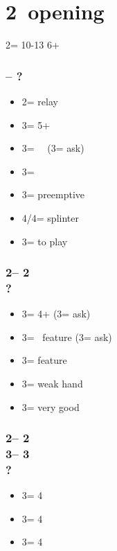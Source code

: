 \documentclass[12pt, a4paper]{article}
\begin{document}
\section*{\colorbox{blue!30}{2\spades\ opening}}
 {

    2\spades = 10-13 6+\spades

    \subsubsection*{\alrts{2\spades} -- ?}
    \begin{itemize}
        \item 2\nt = relay
        \item 3\clubs = 5+\hearts\ \fonce
        \item 3\diams = \minor\ \gf\ (3\hearts = ask)
        \item 3\hearts = \spades\ \invp
        \item 3\spades = preemptive
        \item 4\minor/4\hearts = splinter
        \item 3\nt = to play
    \end{itemize}

    \subsubsection*{2\spades -- 2\nt\\
                    ?}
    \begin{itemize}
        \item 3\clubs = 4+\twosuit{\minor}{\hearts} (3\diams = ask)
        \item 3\diams = \minor\ feature (3\hearts = ask)
        \item 3\hearts = \hearts feature
        \item 3\spades = weak hand
        \item 3\nt = very good \spades
    \end{itemize}

    \subsubsection*{2\spades -- 2\nt\\
                    3\clubs -- 3\diams\\
                    ?}
    \begin{itemize}
        \item 3\hearts = 4\hearts
        \item 3\spades = 4\clubs
        \item 3\nt = 4\diams
    \end{itemize}

}
\end{document}
